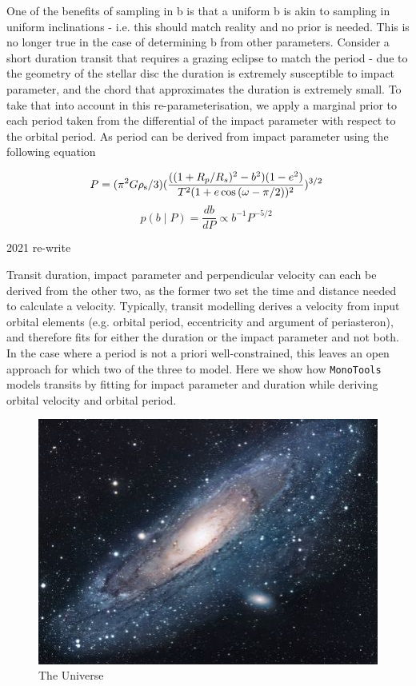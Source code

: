 \documentclass{article}
\begin{document}
One of the benefits of sampling in b is that a uniform b is akin to sampling in uniform inclinations - i.e. this should match reality and no prior is needed.
This is no longer true in the case of determining b from other parameters.
Consider a short duration transit that requires a grazing eclipse to match the period - due to the geometry of the stellar disc the duration is extremely susceptible to impact parameter, and the chord that approximates the duration is extremely small. 
To take that into account in this re-parameterisation, we apply a marginal prior to each period taken from the differential of the impact parameter with respect to the orbital period.
As period can be derived from impact parameter using the following equation


\begin{equation}
P = (\pi^2 G \rho_{\rm s} /3)(\frac{((1+R_p/R_s)^2 - b^2)(1-e^2)}{T^2 (1+e\cos{(\omega - \pi/2)})^2})^{3/2} \;
\end{equation}
\begin{equation}
p(b \mid P) = \frac{d b}{d P} \propto b^{-1}P^{-5/2} \;
\end{equation}


2021 re-write

Transit duration, impact parameter and perpendicular velocity can each be derived from the other two, as the former two set the time and distance needed to calculate a velocity.
Typically, transit modelling derives a velocity from input orbital elements (e.g. orbital period, eccentricity and argument of periasteron), and therefore fits for either the duration or the impact parameter and not both.
In the case where a period is not a priori well-constrained, this leaves an open approach for which two of the three to model.
Here we show how \texttt{MonoTools} models transits by fitting for impact parameter and duration while deriving orbital velocity and orbital period.



\begin{figure}[h!]
\centering
\includegraphics[scale=1.7]{universe}
\caption{The Universe}
\label{fig:universe}
\end{figure}
\end{document}
